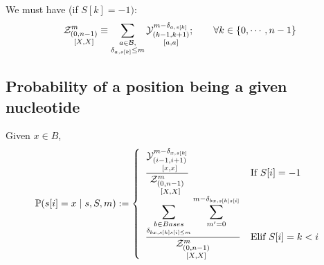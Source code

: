 \documentclass[11pt]{article} %
\begin{document}
\subsection*{}
We must have (if $S[k] = -1)$:
$$
	\Z{0,n-1}{m}{X,X} \equiv     
	\sum_{\substack{a\in \B,\\ \Kron_{a,s[k]}\le m}}	
	\Y{k-1,k+1}{m-\Kron_{a,s[k]}}{a,a};\qquad
	\forall k \in \{0,\cdots,n-1\}
$$

\subsection{Probability of a position being a given nucleotide}
Given $x\in B$,
$$
	\mathbb{P}(s[i] = x\mid s, S,m):=\left\{
	\begin{array}{ll}
		\displaystyle
		\frac{
			\Y{i-1,i+1}{m-\Kron_{x,s[k]}}{x,x}
			}{
			\Z{0,n-1}{m}{X,X}
			}
		&\text{If }S[i] = -1\\
		\displaystyle
 		\frac{
			\displaystyle
			\sum_{\substack{b\in Bases\\\Kron_{bx,s[k]s[i]\leq m}}}
			\sum_{m'=0}^{m-\Kron_{bx,s[k]s[i]}}
			}{
			\Z{0,n-1}{m}{X,X}
			}
		&\text{Elif }S[i]=k<i
	\end{array}\right.
$$
\end{document}
